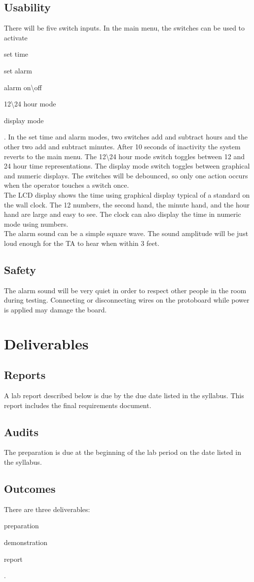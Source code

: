 \documentclass{article}
\begin{document}
	\subsection{Usability}
		There will be five switch inputs. In the main menu, the switches can be used to activate
		\begin{inlinelist}
			\item set time
			\item set alarm
			\item alarm on\textbackslash off
			\item 12\textbackslash 24 hour mode
			\item display mode
		\end{inlinelist}.
		In the set time and alarm modes, two switches add and subtract hours and the other two add and subtract minutes. After 10 seconds of inactivity the system reverts to the main menu. The 12\textbackslash 24 hour mode switch toggles between 12 and 24 hour time representations. The display mode switch toggles between graphical and numeric displays. The switches will be debounced, so only one action occurs when the operator touches a switch once.\\
		The LCD display shows the time using graphical display typical of a standard on the wall clock. The 12 numbers, the second hand, the minute hand, and the hour hand are large and easy to see. The clock can also display the time in numeric mode using numbers.\\
		The alarm sound can be a simple square wave. The sound amplitude will be just loud enough for the TA to hear when within 3 feet.
		
	\subsection{Safety}
		The alarm sound will be very quiet in order to respect other people in the room during testing. Connecting or disconnecting wires on the protoboard while power is applied may damage the board.

\section{Deliverables}

	\subsection{Reports}
		A lab report described below is due by the due date listed in the syllabus. This report includes the final requirements document.
	
	\subsection{Audits}
		The preparation is due at the beginning of the lab period on the date listed in the syllabus.
	
	\subsection{Outcomes}
		There are three deliverables:
		\begin{inlinelist}
			\item preparation
			\item demonstration
			\item report
		\end{inlinelist}.
\end{document}
